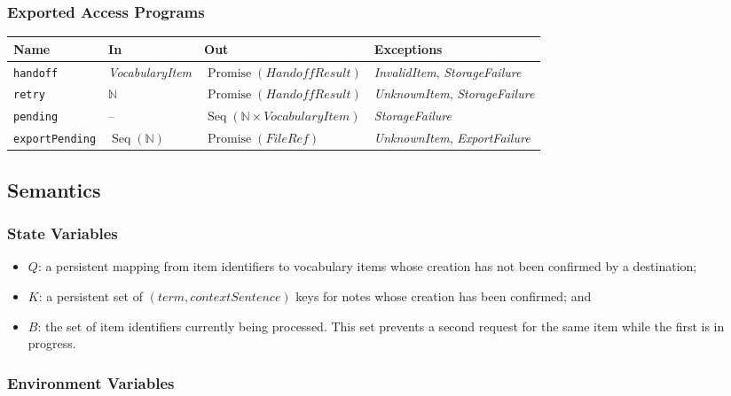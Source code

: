 \documentclass[12pt, titlepage]{article}
\begin{document}
\subsubsection{Exported Access Programs}

\begin{center}
\small
\begin{tabularx}{\textwidth}{p{2.6cm} X X p{2.5cm}}
\toprule
\textbf{Name} & \textbf{In} & \textbf{Out} & \textbf{Exceptions} \\
\midrule
\texttt{handoff} & \textit{VocabularyItem} &
  $\operatorname{Promise}(\textit{HandoffResult})$ &
  \textit{InvalidItem}, \textit{StorageFailure} \\
\texttt{retry} & $\mathbb{N}$ &
  $\operatorname{Promise}(\textit{HandoffResult})$ &
  \textit{UnknownItem}, \textit{StorageFailure} \\
\texttt{pending} & -- & $\operatorname{Seq}(\mathbb{N} \times \textit{VocabularyItem})$ &
  \textit{StorageFailure} \\
\texttt{exportPending} & $\operatorname{Seq}(\mathbb{N})$ &
  $\operatorname{Promise}(\textit{FileRef})$ &
  \textit{UnknownItem}, \textit{ExportFailure} \\
\bottomrule
\end{tabularx}
\normalsize
\end{center}

\subsection{Semantics}

\subsubsection{State Variables}

\begin{itemize}
  \item $Q$: a persistent mapping from item identifiers to vocabulary items
  whose creation has not been confirmed by a destination;
  \item $K$: a persistent set of $(term, contextSentence)$ keys for notes whose
  creation has been confirmed; and
  \item $B$: the set of item identifiers currently being processed.  This set
  prevents a second request for the same item while the first is in progress.
\end{itemize}

\subsubsection{Environment Variables}
\end{document}
